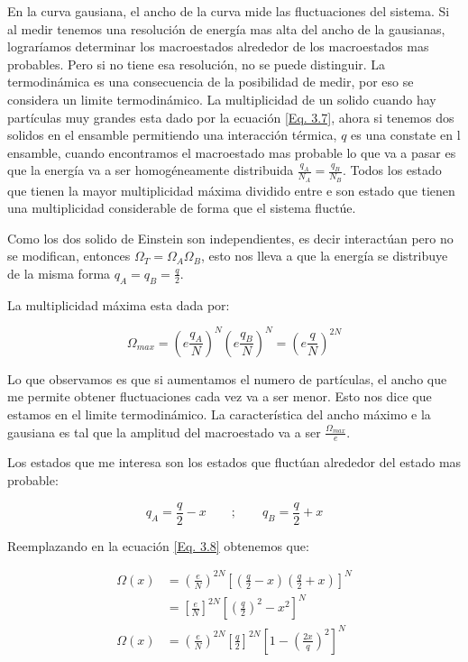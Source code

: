 \documentclass[11pt,fleqn]{book}
\begin{document}
En la curva gausiana, el ancho de la curva mide las fluctuaciones del sistema. Si al medir tenemos una resolución de energía mas alta del ancho de la gausianas, lograríamos determinar los macroestados alrededor de los macroestados mas probables. Pero si no tiene esa resolución, no se puede distinguir. La termodinámica es una consecuencia de la posibilidad de medir, por eso se considera un limite termodinámico. La multiplicidad de un solido cuando hay partículas muy grandes esta dado por la ecuación \ref{Eq. 3.7}, ahora si tenemos dos solidos en el ensamble permitiendo una interacción térmica, $q$ es una constate en l ensamble, cuando encontramos el macroestado mas probable lo que va a pasar es que la energía va a ser homogéneamente distribuida $\frac{q_{A}}{N_{A}}=\frac{q_{B}}{N_{B}}$.  Todos los estado que tienen la mayor multiplicidad máxima dividido entre e son estado que tienen una multiplicidad considerable de forma que el sistema fluctúe.

Como los dos solido de Einstein son independientes, es decir interactúan pero no se modifican, entonces $\Omega_{T}=\Omega_{A}\Omega_{B}$, esto nos lleva a que la energía se distribuye de la misma forma $q_{A}=q_{B}=\frac{q}{2}$. 



La multiplicidad máxima esta dada por:

\begin{equation}
    \Omega_{max}=\left(e\frac{q_{A}}{N}\right)^{N}\left(e\frac{q_{B}}{N}\right)^{N}=\left(e\frac{q}{N}\right)^{2N}
    \label{Eq. 3.8}
\end{equation}

Lo que observamos es que si aumentamos el numero de partículas, el ancho que me permite obtener fluctuaciones cada vez va a ser menor. Esto nos dice que estamos en el limite termodinámico. La característica del ancho máximo e la gausiana es tal que la amplitud del macroestado va a ser $\frac{\Omega_{max}}{e}$.

Los estados que me interesa son los estados que fluctúan alrededor del estado mas probable:

\begin{equation*}
    q_{A}=\frac{q}{2}-x\qquad;\qquad q_{B}=\frac{q}{2}+x
\end{equation*}

Reemplazando en la ecuación \ref{Eq. 3.8} obtenemos que:

\begin{equation}
\begin{split}
\Omega(x)&=\left(\frac{e}{N}\right)^{2N}\left[\left(\frac{q}{2}-x\right)\left(\frac{q}{2}+x\right)\right]^{N}\\
&=\left[\frac{e}{N}\right]^{2N}\left[\left(\frac{q}{2}\right)^{2}-x^{2}\right]^{N}\\
\Omega(x)&=\left(\frac{e}{N}\right)^{2 N}\left[\frac{q}{2}\right]^{2 N}\left[1-\left(\frac{2x}{q}\right)^{2}\right]^{N}
\end{split}
\label{Eq. 3.9}
\end{equation}
\end{document}
